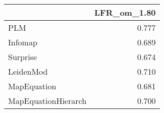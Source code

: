 \begin{tabular}{lr}
\toprule
{} & LFR_om_1.80 \\
\midrule
PLM                 &       0.777 \\
Infomap             &       0.689 \\
Surprise            &       0.674 \\
LeidenMod           &       0.710 \\
MapEquation         &       0.681 \\
MapEquationHierarch &       0.700 \\
\bottomrule
\end{tabular}
